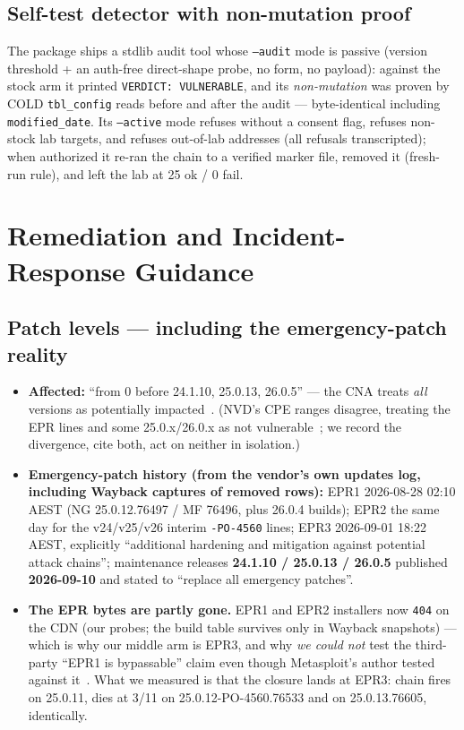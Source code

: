 \documentclass[journal]{IEEEtran}
\begin{document}
\subsection{Self-test detector with non-mutation proof}
The package ships a stdlib audit tool whose \texttt{--audit} mode is passive
(version threshold + an auth-free direct-shape probe, no form, no payload):
against the stock arm it printed \texttt{VERDICT: VULNERABLE}, and its
\emph{non-mutation} was proven by COLD \texttt{tbl\_config} reads before and
after the audit — byte-identical including \texttt{modified\_date}. Its
\texttt{--active} mode refuses without a consent flag, refuses non-stock lab
targets, and refuses out-of-lab addresses (all refusals transcripted); when
authorized it re-ran the chain to a verified marker file, removed it
(fresh-run rule), and left the lab at 25 ok / 0 fail.

\section{Remediation and Incident-Response Guidance}
\label{sec:remediation}

\subsection{Patch levels — including the emergency-patch reality}
\begin{itemize}
\item \textbf{Affected:} ``from 0 before 24.1.10, 25.0.13, 26.0.5'' — the CNA
treats \emph{all} versions as potentially impacted~\cite{cve82078}. (NVD's CPE
ranges disagree, treating the EPR lines and some 25.0.x/26.0.x as not
vulnerable~\cite{nvd}; we record the divergence, cite both, act on neither in
isolation.)
\item \textbf{Emergency-patch history (from the vendor's own updates log,
including Wayback captures of removed rows):} EPR1 2026-08-28 02:10 AEST (NG
25.0.12.76497 / MF 76496, plus 26.0.4 builds); EPR2 the same day for the
v24/v25/v26 interim \texttt{-PO-4560} lines; EPR3 2026-09-01 18:22 AEST,
explicitly ``additional hardening and mitigation against potential attack
chains''; maintenance releases \textbf{24.1.10 / 25.0.13 / 26.0.5} published
\textbf{2026-09-10} and stated to ``replace all emergency patches''.
\item \textbf{The EPR bytes are partly gone.} EPR1 and EPR2 installers now
\texttt{404} on the CDN (our probes; the build table survives only in Wayback
snapshots) — which is why our middle arm is EPR3, and why \emph{we could not}
test the third-party ``EPR1 is bypassable'' claim even though Metasploit's
author tested against it~\cite{msf,techanarchy,r7}. What we measured is that
the closure lands at EPR3: chain fires on 25.0.11, dies at 3/11 on
25.0.12-PO-4560.76533 and on 25.0.13.76605, identically.
\end{itemize}
\end{document}

